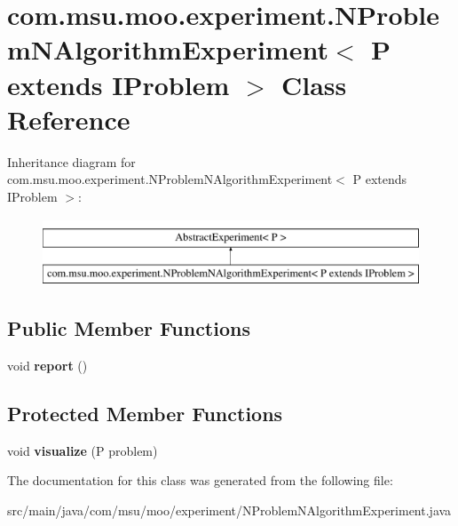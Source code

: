 \hypertarget{classcom_1_1msu_1_1moo_1_1experiment_1_1NProblemNAlgorithmExperiment_3_01P_01extends_01IProblem_01_4}{\section{com.\-msu.\-moo.\-experiment.\-N\-Problem\-N\-Algorithm\-Experiment$<$ P extends I\-Problem $>$ Class Reference}
\label{classcom_1_1msu_1_1moo_1_1experiment_1_1NProblemNAlgorithmExperiment_3_01P_01extends_01IProblem_01_4}
}
Inheritance diagram for com.\-msu.\-moo.\-experiment.\-N\-Problem\-N\-Algorithm\-Experiment$<$ P extends I\-Problem $>$\-:\begin{figure}[H]
\begin{center}
\leavevmode
\includegraphics[height=2.000000cm]{classcom_1_1msu_1_1moo_1_1experiment_1_1NProblemNAlgorithmExperiment_3_01P_01extends_01IProblem_01_4}
\end{center}
\end{figure}
\subsection*{Public Member Functions}
\begin{DoxyCompactItemize}
\item 
\hypertarget{classcom_1_1msu_1_1moo_1_1experiment_1_1NProblemNAlgorithmExperiment_3_01P_01extends_01IProblem_01_4_ad241c0877d63849163f7a66c5723bc29}{void {\bfseries report} ()}\label{classcom_1_1msu_1_1moo_1_1experiment_1_1NProblemNAlgorithmExperiment_3_01P_01extends_01IProblem_01_4_ad241c0877d63849163f7a66c5723bc29}

\end{DoxyCompactItemize}
\subsection*{Protected Member Functions}
\begin{DoxyCompactItemize}
\item 
\hypertarget{classcom_1_1msu_1_1moo_1_1experiment_1_1NProblemNAlgorithmExperiment_3_01P_01extends_01IProblem_01_4_ababd618896299060ebe776f1c6249bb2}{void {\bfseries visualize} (P problem)}\label{classcom_1_1msu_1_1moo_1_1experiment_1_1NProblemNAlgorithmExperiment_3_01P_01extends_01IProblem_01_4_ababd618896299060ebe776f1c6249bb2}

\end{DoxyCompactItemize}


The documentation for this class was generated from the following file\-:\begin{DoxyCompactItemize}
\item 
src/main/java/com/msu/moo/experiment/N\-Problem\-N\-Algorithm\-Experiment.\-java\end{DoxyCompactItemize}

